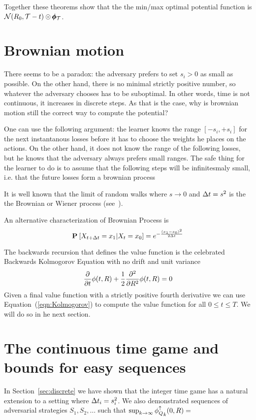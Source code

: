 \documentclass{article}[12pt]
\begin{document}
Together these theorems show that the the min/max optimal potential function is $ {\cal N}(R_0,\mathcal{T}-t) \odot \pmb{\phi}_{\mathcal{T}}$.

\section{Brownian motion}
\label{sec:continuous}

There seems to be a paradox: the adversary prefers to set $s_i>0$ as
small as possible. On the other hand, there is no minimal strictly
positive number, so whatever the adversary chooses has to be
suboptimal. In other words, time is not continuous, it increases in
discrete steps. As that is the case, why is brownian motion still
the correct way to compute the potential?

One can use the following argument: the learner knows the range
$[-s_i,+s_i]$ for the next instantanous losses before it has to choose
the weights he places on the actions. On the other hand, it does not
know the range of the following losses, but he knows that the
adversary always prefers small ranges. The safe thing for the learner
to do is to assume that the following steps will be infinitesmaly
small, i.e. that the future losses form a brownian process

It is well known that the limit of random walks where $s \to 0$ and
$\Delta t=s^2$ is the the Brownian or Wiener process
(see~\cite{kac1947random}).

An alternative characterization of Brownian Process is
$$ {\bf P}_{}\left[ X_{t+\Delta t}=x_1 | X_t=x_0 \right]=e^{-\frac{(x_1-x_0)^2}{2 \Delta t}}$$

The backwards recursion that
defines the value function is the celebrated Backwards Kolmogorov
Equation with no drift and unit variance
\begin{equation} \label{eqn:Kolmogorov}
  \frac{\partial}{\partial t} \phi(t,R)
  + \frac{1}{2} \frac{\partial^2}{\partial R^2} \phi(t,R)=0
\end{equation}
Given a final value function with a strictly positive fourth
derivative we can use Equation~(\ref{eqn:Kolmogorov}) to compute the
value function for all $0 \leq t \leq T$. We will do so in he next section.

\section{The continuous time game and bounds for easy
  sequences} \label{sec:easy}

In Section~\ref{sec:discrete} we have shown that the integer time game
has a natural extension to a setting where $\Delta t_i = s_i^2$. We
also demonstrated sequences of adversarial strategies $S_1,S_2,\ldots$
such that $\sup_{k \to \infty} {\phi_{Q}^{\uparrow}}_k(0,R) = $
\end{document}

